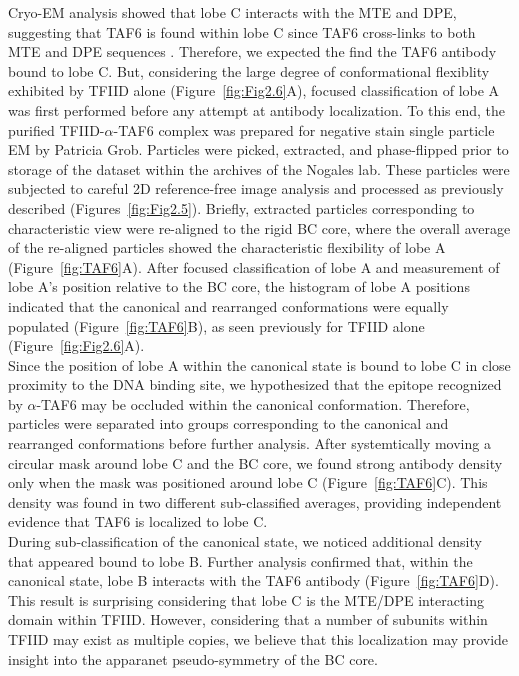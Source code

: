 Cryo-EM analysis showed that lobe C interacts with the MTE and DPE, suggesting that TAF6 is found within lobe C since TAF6 cross-links to both MTE and DPE sequences \cite{Burke_2739,Lim_1522}. Therefore, we expected the find the TAF6 antibody bound to lobe C. But, considering the large degree of conformational flexiblity exhibited by TFIID alone (Figure~\ref{fig:Fig2.6}A), focused classification of lobe A was first performed before any attempt at antibody localization. To this end, the purified TFIID-$\alpha$-TAF6 complex was prepared for negative stain single particle EM by Patricia Grob. Particles were picked, extracted, and phase-flipped prior to storage of the dataset within the archives of the Nogales lab. These particles were subjected to careful 2D reference-free image analysis and processed as previously described (Figures~\ref{fig:Fig2.5}). Briefly, extracted particles corresponding to characteristic view were re-aligned to the rigid BC core, where the overall average of the re-aligned particles showed the characteristic flexibility of lobe A (Figure~\ref{fig:TAF6}A). After focused classification of lobe A and measurement of lobe A's position relative to the BC core, the histogram of lobe A positions indicated that the canonical and rearranged conformations were equally populated (Figure~\ref{fig:TAF6}B), as seen previously for TFIID alone (Figure~\ref{fig:Fig2.6}A). \\
\indent Since the position of lobe A within the canonical state is bound to lobe C in close proximity to the DNA binding site, we hypothesized that the epitope recognized by $\alpha$-TAF6 may be occluded within the canonical conformation. Therefore, particles were separated into groups corresponding to the canonical and rearranged conformations before further analysis. After systemtically moving a circular mask around lobe C and the BC core, we found strong antibody density only when the mask was positioned around lobe C (Figure~\ref{fig:TAF6}C). This density was found in two different sub-classified averages, providing independent evidence that TAF6 is localized to lobe C. \\
\indent During sub-classification of the canonical state, we noticed additional density that appeared bound to lobe B. Further analysis confirmed that, within the canonical state, lobe B interacts with the TAF6 antibody (Figure~\ref{fig:TAF6}D). This result is surprising considering that lobe C is the MTE/DPE interacting domain within TFIID. However, considering that a number of subunits within TFIID may exist as multiple copies, we believe that this localization may provide insight into the apparanet pseudo-symmetry of the BC core.
